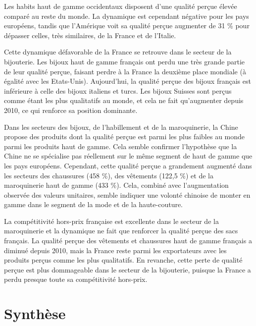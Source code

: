 \documentclass[french,10pt,a4paper]{article}
\begin{document}
Les habits haut de gamme occidentaux disposent d'une qualité perçue élevée comparé au reste du monde. La dynamique est cependant négative pour les pays européens, tandis que l'Amérique voit sa qualité perçue augmenter de 31 \% pour dépasser celles, très similaires, de la France et de l'Italie.

Cette dynamique défavorable de la France se retrouve dans le secteur de la bijouterie. Les bijoux haut de gamme français ont perdu une très grande partie de leur qualité perçue, faisant perdre à la France la deuxième place mondiale (à égalité avec les Etats-Unis). Aujourd'hui, la qualité perçue des bijoux français est inférieure à celle des bijoux italiens et turcs. Les bijoux Suisses sont perçus comme étant les plus qualitatifs au monde, et cela ne fait qu'augmenter depuis 2010, ce qui renforce sa position dominante. 

Dans les secteurs des bijoux, de l'habillement et de la maroquinerie, la Chine propose des produits dont la qualité perçue est parmi les plus faibles au monde parmi les produits haut de gamme. Cela semble confirmer l'hypothèse que la Chine ne se spécialise pas réellement sur le même segment de haut de gamme que les pays européens. Cependant, cette qualité perçue a grandement augmenté dans les secteurs des chaussures (458 \%), des vêtements (122,5 \%) et de la maroquinerie haut de gamme (433 \%). Cela, combiné avec l'augmentation observée des valeurs unitaires, semble indiquer une volonté chinoise de monter en gamme dans le segment de la mode et de la haute-couture.

\bigskip

La compétitivité hors-prix française est excellente dans le secteur de la maroquinerie et la dynamique ne fait que renforcer la qualité perçue des sacs français. La qualité perçue des vêtements et chaussures haut de gamme français a diminué depuis 2010, mais la France reste parmi les exportateurs avec les produits perçus comme les plus qualitatifs. En revanche, cette perte de qualité perçue est plus dommageable dans le secteur de la bijouterie, puisque la France a perdu presque toute sa compétitivité hors-prix.





\newpage
\section{Synthèse}
\end{document}
